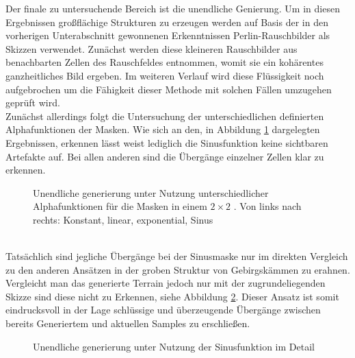 Der finale zu untersuchende Bereich ist die unendliche Genierung. Um in diesen Ergebnissen großflächige Strukturen zu erzeugen werden auf Basis der in den vorherigen Unterabschnitt gewonnenen Erkenntnissen Perlin-Rauschbilder als Skizzen verwendet. Zunächst werden diese kleineren Rauschbilder aus benachbarten Zellen des Rauschfeldes entnommen, womit sie ein kohärentes ganzheitliches Bild ergeben. Im weiteren Verlauf wird diese Flüssigkeit noch aufgebrochen um die Fähigkeit dieser Methode mit solchen Fällen umzugehen geprüft wird. \\
Zunächst allerdings folgt die Untersuchung der unterschiedlichen definierten Alphafunktionen der Masken. Wie sich an den, in Abbildung \ref{fig:masks} dargelegten Ergebnissen, erkennen lässt weist lediglich die Sinusfunktion keine sichtbaren Artefakte auf. Bei allen anderen sind die Übergänge einzelner Zellen klar zu erkennen. 
\begin{figure}[htbp]
    \centering
    \caption{Unendliche generierung unter Nutzung unterschiedlicher Alphafunktionen für die Masken in einem $2\times2$ . Von links nach rechts: Konstant, linear, exponential, Sinus}
    \label{fig:masks}
\end{figure} \\
Tatsächlich sind jegliche Übergänge bei der Sinusmaske nur im direkten Vergleich zu den anderen Ansätzen in der groben Struktur von Gebirgskämmen zu erahnen. Vergleicht man das generierte Terrain jedoch nur mit der zugrundeliegenden Skizze sind diese nicht zu Erkennen, siehe Abbildung \ref{fig:cos_detail}. Dieser Ansatz ist somit eindrucksvoll in der Lage schlüssige und überzeugende Übergänge zwischen bereits Generiertem und aktuellen Samples zu erschließen.
\begin{figure}[htbp]
    \centering
    \caption{Unendliche generierung unter Nutzung der Sinusfunktion im Detail}
    \label{fig:cos_detail}
\end{figure} \\
